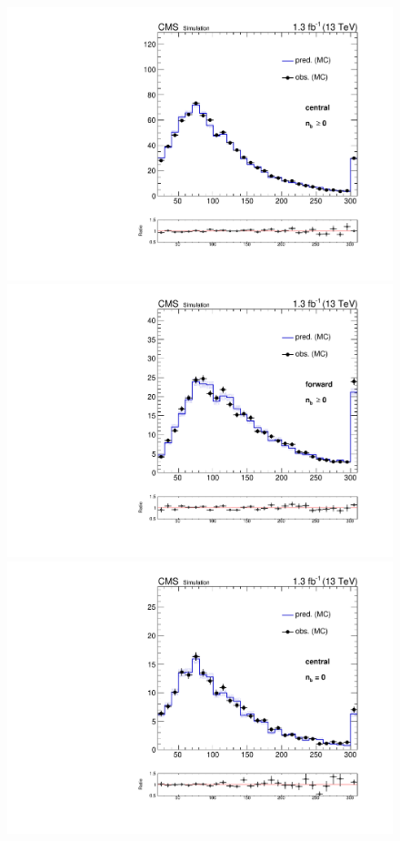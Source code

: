 \begin{figure}[htb]
  \begin{center}
    \includegraphics[scale=0.30]{bkgd/figs/plot_results_mll_MCClosure_central_onlyTT_nbInc.pdf}
    \includegraphics[scale=0.30]{bkgd/figs/plot_results_mll_MCClosure_forward_onlyTT_nbInc.pdf}\\
    \includegraphics[scale=0.30]{bkgd/figs/plot_results_mll_MCClosure_central_onlyTT_nb0.pdf}

\end{center}
\end{figure}

